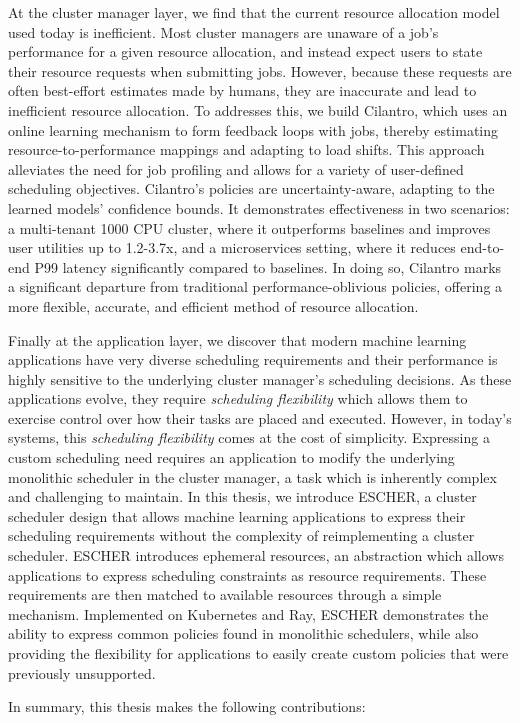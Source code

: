 At the cluster manager layer, we find that the current resource allocation model used today is inefficient. Most cluster managers are unaware of a job's performance for a given resource allocation, and instead expect users to state their resource requests when submitting jobs. However, because these requests are often best-effort estimates made by humans, they are inaccurate and lead to inefficient resource allocation. To addresses this, we build Cilantro, which uses an online learning mechanism to form feedback loops with jobs, thereby estimating resource-to-performance mappings and adapting to load shifts. This approach alleviates the need for job profiling and allows for a variety of user-defined scheduling objectives. Cilantro's policies are uncertainty-aware, adapting to the learned models' confidence bounds. It demonstrates effectiveness in two scenarios: a multi-tenant 1000 CPU cluster, where it outperforms baselines and improves user utilities up to 1.2-3.7x, and a microservices setting, where it reduces end-to-end P99 latency significantly compared to baselines. In doing so, Cilantro marks a significant departure from traditional performance-oblivious policies, offering a more flexible, accurate, and efficient method of resource allocation.

Finally at the application layer, we discover that modern machine learning applications have very diverse scheduling requirements and their performance is highly sensitive to the underlying cluster manager's scheduling decisions.  As these applications evolve, they require \textit{scheduling flexibility} which allows them to exercise control over how their tasks are placed and executed. However, in today's systems, this \textit{scheduling flexibility} comes at the cost of simplicity. Expressing a custom scheduling need requires an application to modify the underlying monolithic scheduler in the cluster manager, a task which is inherently complex and challenging to maintain. In this thesis, we introduce ESCHER, a cluster scheduler design that allows machine learning applications to express their scheduling requirements without the complexity of reimplementing a cluster scheduler. ESCHER introduces ephemeral resources, an abstraction which allows applications to express scheduling constraints as resource requirements. These requirements are then matched to available resources through a simple mechanism. Implemented on Kubernetes and Ray, ESCHER demonstrates the ability to express common policies found in monolithic schedulers, while also providing the flexibility for applications to easily create custom policies that were previously unsupported. %

In summary, this thesis makes the following contributions:


